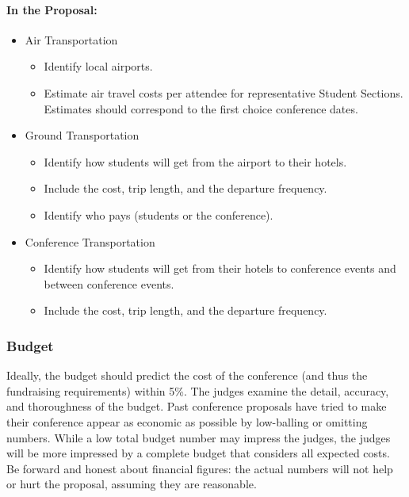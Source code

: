 \documentclass[12pt]{article}
\begin{document}
\paragraph{In the Proposal:}
\begin{itemize}
\item{Air Transportation
\begin{itemize}
\item{Identify local airports.}
\item{Estimate air travel costs per attendee for representative Student Sections.
Estimates should correspond to the first choice conference dates.}
\end{itemize}
}

\item{Ground Transportation
\begin{itemize}
\item{Identify how students will get from the airport to their hotels.}
\item{Include the cost, trip length, and the departure frequency.}
\item{Identify who pays (students or the conference).}
\end{itemize}
}

\item{Conference Transportation
\begin{itemize}
\item{Identify how students will get from their hotels to conference events and between conference events.}
\item{Include the cost, trip length, and the departure frequency.}
\end{itemize}
}
\end{itemize}

\subsubsection{Budget}
Ideally, the budget should predict the cost of the conference (and thus the fundraising
requirements) within 5\%. The judges examine the detail, accuracy, and thoroughness of
the budget. Past conference proposals have tried to make their conference appear as
economic as possible by low-balling or omitting numbers. While a low total budget
number may impress the judges, the judges will be more impressed by a complete budget
that considers all expected costs. Be forward and honest about financial figures: the
actual numbers will not help or hurt the proposal, assuming they are reasonable.
\end{document}
